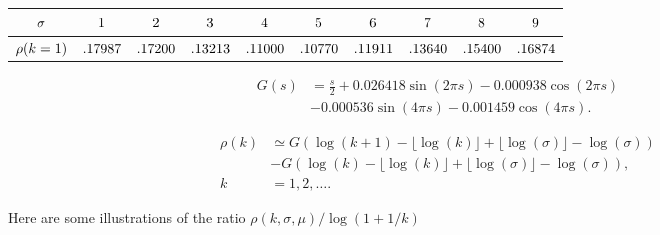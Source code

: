 \documentclass[titlepage,fleqn]{article}%
\begin{document}
\bigskip%
\begin{tabular}
[c]{|c|c|c|c|c|c|c|c|c|c|}\hline\hline
${\small \sigma}$ & ${\small 1}$ & ${\small 2}$ & ${\small 3}$ & ${\small 4} $
& ${\small 5}$ & ${\small 6}$ & ${\small 7}$ & ${\small 8}$ & ${\small 9}%
$\\\hline
${\small \rho(k=1)}$ & ${\small .17987}$ & ${\small .17200}$ &
${\small .13213}$ & ${\small .11000}$ & ${\small .10770}$ & ${\small .11911}$
& ${\small .13640}$ & ${\small .15400}$ & ${\small .16874}$\\\hline\hline
\end{tabular}%
\begin{align*}
G(s)  &  =\frac{s}{2}+0.026418\sin(2\pi s)-0.000938\cos(2\pi s)\\
&  -0.000536\sin(4\pi s)-0.001459\cos(4\pi s).
\end{align*}
%

\begin{align*}
\rho(k)  &  \simeq G(\log(k+1)-\lfloor\log(k)\rfloor+\lfloor\log
(\sigma)\rfloor-\log(\sigma))\\
&  -G(\log(k)-\lfloor\log(k)\rfloor+\lfloor\log(\sigma)\rfloor-\log
(\sigma)),\\
k  &  =1,2,\ldots.
\end{align*}


\bigskip Here are some illustrations of the ratio $\rho(k,\sigma,\mu
)/\log(1+1/k)$%

%
\end{document}
